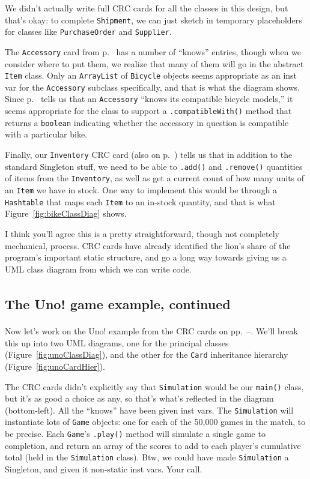 We didn't actually write full CRC cards for all the classes in this design, but
that's okay: to complete \texttt{Shipment}, we can just sketch in temporary
placeholders for classes like \texttt{PurchaseOrder} and \texttt{Supplier}.

The \texttt{Accessory} card from p.~\pageref{bikeCRC2} has a number of
``knows'' entries, though when we consider where to put them, we realize that
many of them will go in the abstract \texttt{Item} class. Only an
\texttt{ArrayList} of \texttt{Bicycle} objects seems appropriate as an inst var
for the \texttt{Accessory} subclass specifically, and that is what the diagram
shows. Since p.~\pageref{bikeCRC2} tells us that an \texttt{Accessory} ``knows
its compatible bicycle models,'' it seems appropriate for the class to support
a \texttt{.compatibleWith()} method that returns a \texttt{boolean} indicating
whether the accessory in question is compatible with a particular bike.

Finally, our \texttt{Inventory} CRC card (also on p.~\pageref{bikeCRC2}) tells
us that in addition to the standard Singleton stuff, we need to be able to
\texttt{.add()} and \texttt{.remove()} quantities of items from the
\texttt{Inventory}, as well as get a current count of how many units of an
\texttt{Item} we have in stock. One way to implement this would be through a
\texttt{Hashtable} that maps each \texttt{Item} to an in-stock quantity, and
that is what Figure~\ref{fig:bikeClassDiag} shows.

I think you'll agree this is a pretty straightforward, though not completely
mechanical, process. CRC cards have already identified the lion's share of the
program's important static structure, and go a long way towards giving us a UML
class diagram from which we can write code.

\subsection{The Uno!\textsuperscript{\textregistered} game example, continued}

Now let's work on the Uno!\textsuperscript{\textregistered} example from the
CRC cards on pp.~\pageref{unoCRC1}--\pageref{unoCRC2}. We'll break this up into
two UML diagrams, one for the principal classes
(Figure~\ref{fig:unoClassDiag}), and the other for the \texttt{Card}
inheritance hierarchy (Figure~\ref{fig:unoCardHier}).

The CRC cards didn't explicitly say that \texttt{Simulation} would be our
\texttt{main()} class, but it's as good a choice as any, so that's what's
reflected in the diagram (bottom-left). All the ``knows'' have been given inst
vars. The \texttt{Simulation} will instantiate lots of \texttt{Game} objects:
one for each of the 50,000 games in the match, to be precise. Each
\texttt{Game}'s \texttt{.play()} method will simulate a single game to
completion, and return an array of the scores to add to each player's
cumulative total (held in the \texttt{Simulation} class). Btw,
we could have made \texttt{Simulation} a Singleton, and given it non-static
inst vars. Your call.

